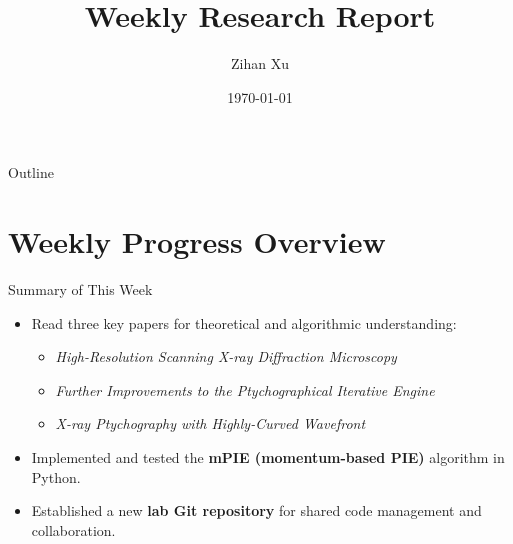 \documentclass[15pt]{beamer}
\title{Weekly Research Report}
\subtitle{}
\author{Zihan Xu}
\date{\today}
\begin{document}
\begin{frame}[plain]
  \titlepage
\end{frame}
\addtocounter{framenumber}{-1}

\begin{frame}[plain]{Outline}
  \tableofcontents[sectionstyle=show, subsectionstyle=hide]
\end{frame}
\addtocounter{framenumber}{-1}

\section{Weekly Progress Overview}
\begin{frame}{Summary of This Week}

\begin{itemize}
  \item Read three key papers for theoretical and algorithmic understanding:
  \begin{itemize}
    \item \textit{High-Resolution Scanning X-ray Diffraction Microscopy}
    \item \textit{Further Improvements to the Ptychographical Iterative Engine}
    \item \textit{X-ray Ptychography with Highly-Curved Wavefront}
  \end{itemize}

  \item Implemented and tested the \textbf{mPIE (momentum-based PIE)} algorithm in Python.

  \item Established a new \textbf{lab Git repository} for shared code management and collaboration.
\end{itemize}

\end{frame}


\end{document}
